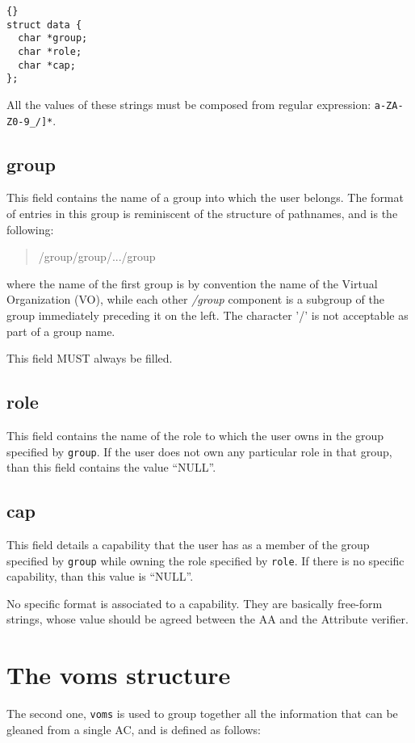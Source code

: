 \documentclass[a4paper]{book}
\begin{document}
{\begin{lstlisting}{}
struct data {
  char *group; 
  char *role;  
  char *cap;   
};
\end{lstlisting}}

All the values of these strings must be composed from regular
expression: \texttt{a-ZA-Z0-9\_/]*}.

\subsection{group}
This field contains the name of a group into which the user belongs.
The format of entries in this group is reminiscent of the structure of
pathnames, and is the following:
\begin{quote}
\begin{emph}
/group/group/.../group
\end{emph}
\end{quote}
where the name of the first group is by convention the name of the
Virtual Organization (VO), while each other \emph{/group} component is
a subgroup of the group immediately preceding it on the left. The
character '/' is not acceptable as part of a group name.

This field MUST always be filled.

\subsection{role}
This field contains the name of the role to which the user owns in the
group specified by \verb|group|.  If the user does not own any
particular role in that group, than this field contains the value
``NULL''.

\subsection{cap}
This field details a capability that the user has as a member of the
group specified by \verb|group| while owning the role specified by
\verb|role|.  If there is no specific capability, than this value is
``NULL''. 

No specific format is associated to a capability.  They are basically
free-form strings, whose value should be agreed between the AA and the
Attribute verifier.

\section{The voms structure}
The second one, \verb|voms| is used to group together all the
information that can be gleaned from a single AC, and is defined as
follows:
\end{document}
